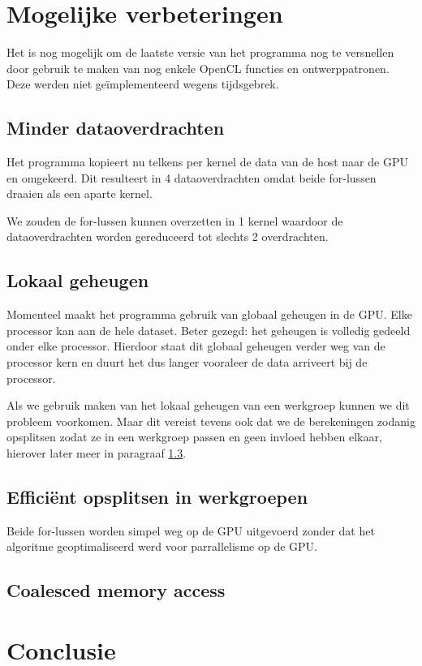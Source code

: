 \documentclass{article}
\begin{document}
\section{Mogelijke verbeteringen}
Het is nog mogelijk om de laatste versie van het programma nog te versnellen door
gebruik te maken van nog enkele OpenCL functies en ontwerppatronen. Deze werden
niet ge\"{i}mplementeerd wegens tijdsgebrek.

\subsection{Minder dataoverdrachten}
Het programma kopieert nu telkens per kernel de data van de host naar de GPU en
omgekeerd. Dit resulteert in 4 dataoverdrachten omdat beide for-lussen draaien
als een aparte kernel.

We zouden de for-lussen kunnen overzetten in 1 kernel waardoor de dataoverdrachten
worden gereduceerd tot slechts 2 overdrachten.

\subsection{Lokaal geheugen}
Momenteel maakt het programma gebruik van globaal geheugen in de GPU. Elke processor
kan aan de hele dataset. Beter gezegd: het geheugen is volledig gedeeld onder elke
processor. Hierdoor staat dit globaal geheugen verder weg van de processor kern
en duurt het dus langer vooraleer de data arriveert bij de processor.

Als we gebruik maken van het lokaal geheugen van een werkgroep kunnen we dit probleem
voorkomen. Maar dit vereist tevens ook dat we de berekeningen zodanig opsplitsen
zodat ze in een werkgroep passen en geen invloed hebben elkaar, hierover later
meer in paragraaf \ref{hfd:werkgroepen}.

\subsection{Effici\"{e}nt opsplitsen in werkgroepen}
\label{hfd:werkgroepen}
Beide for-lussen worden simpel weg op de GPU uitgevoerd zonder dat het algoritme
geoptimaliseerd werd voor parrallelisme op de GPU.

\subsection{Coalesced memory access}

\section{Conclusie}

\end{document}
